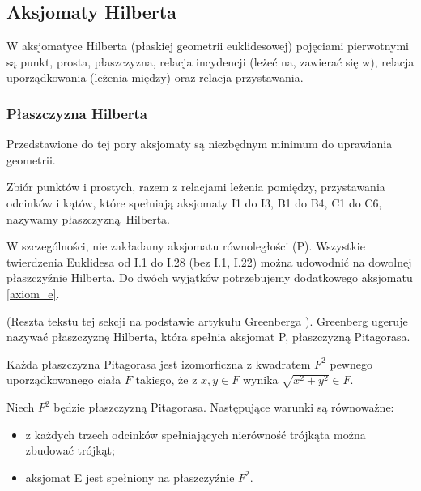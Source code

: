 %

\subsection{Aksjomaty Hilberta}
W aksjomatyce Hilberta (płaskiej geometrii euklidesowej) pojęciami pierwotnymi są punkt, prosta, płaszczyzna, relacja incydencji (leżeć na, zawierać się w), relacja uporządkowania (leżenia między) oraz relacja przystawania.






\subsubsection{Płaszczyzna Hilberta}

Przedstawione do tej pory aksjomaty są niezbędnym minimum do uprawiania geometrii.

\begin{definition}
    Zbiór punktów i prostych, razem z relacjami leżenia pomiędzy, przystawania odcinków i kątów, które spełniają aksjomaty I1 do I3, B1 do B4, C1 do C6, nazywamy płaszczyzną Hilberta.
\end{definition}

W szczególności, nie zakładamy aksjomatu równoległości (P).
Wszystkie twierdzenia Euklidesa od I.1 do I.28 (bez I.1, I.22) można udowodnić na dowolnej płaszczyźnie Hilberta.
Do dwóch wyjątków potrzebujemy dodatkowego aksjomatu \ref{axiom_e}.

(Reszta tekstu tej sekcji na podstawie artykułu Greenberga \cite[s. 201]{greenberg_2010}).
Greenberg ugeruje nazywać płaszczyznę Hilberta, która spełnia aksjomat P, płaszczyzną Pitagorasa.

\begin{proposition}
    Każda płaszczyzna Pitagorasa jest izomorficzna z kwadratem $F^2$ pewnego uporządkowanego ciała $F$ takiego, że z $x, y \in F$ wynika $\sqrt{x^2 + y^2} \in F$.
\end{proposition}

\begin{proposition}
    Niech $F^2$ będzie płaszczyzną Pitagorasa.
    Następujące warunki są równoważne:
    \begin{itemize}
        \item z każdych trzech odcinków spełniających nierówność trójkąta można zbudować trójkąt; 
        \item aksjomat E jest spełniony na płaszczyźnie $F^2$.
    \end{itemize}
\end{proposition}


